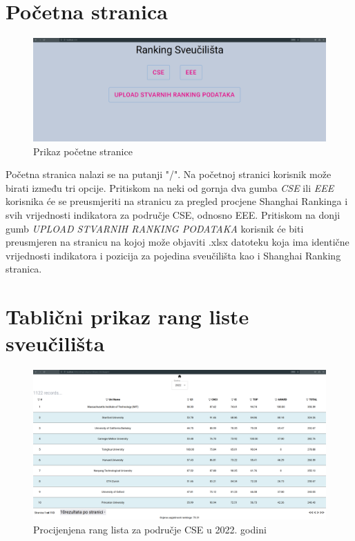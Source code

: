 \documentclass[times, utf8, zavrsni]{fer}
\begin{document}
\section{Početna stranica}

\begin{figure}[htb]
    \hspace*{-2cm}  
    \includegraphics[scale=0.2]{homePage.png} 
    \caption{Prikaz početne stranice}
    \label{fig:homepage}
    \end{figure}
Početna stranica nalazi se na putanji "/". Na početnoj stranici korisnik može birati između tri opcije. Pritiskom na neki od gornja dva gumba \emph{CSE} ili \emph{EEE}
korisnika će se preusmjeriti na stranicu za pregled procjene Shanghai Rankinga i svih vrijednosti indikatora za područje CSE, odnosno EEE.        
Pritiskom na donji gumb \emph{UPLOAD STVARNIH RANKING PODATAKA} korisnik će biti preusmjeren na stranicu na kojoj može objaviti .xlsx datoteku koja ima 
identične vrijednosti indikatora i pozicija za pojedina sveučilišta kao i Shanghai Ranking stranica.
\newpage\section{Tablični prikaz rang liste sveučilišta}
\begin{figure}[htb]
    \hspace*{-2cm}  
    \includegraphics[scale=0.2]{tablica.png} 
    \caption{Procijenjena rang lista za područje CSE u 2022. godini}
    \label{fig:tablica}
    \end{figure}
\end{document}
